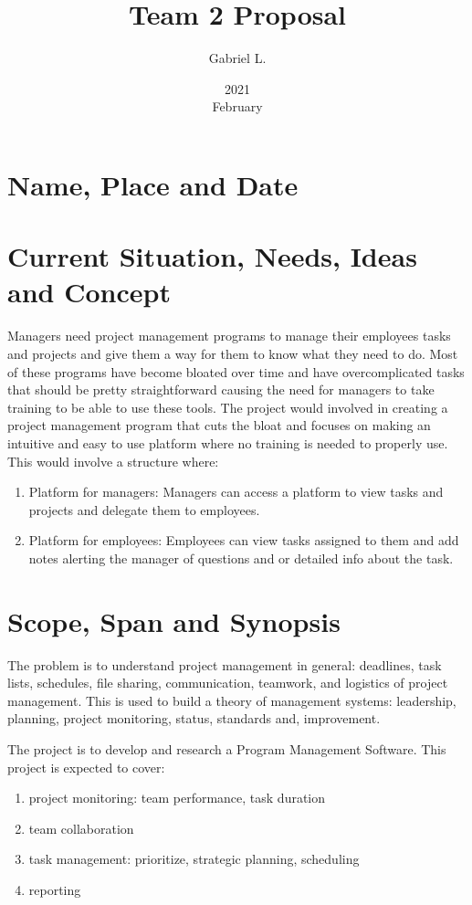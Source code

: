 \documentclass{article}
\title{Team 2 Proposal}
\date{2021 \\ February}
\author{Gabriel L.}
\begin{document}
\maketitle
\section{Name, Place and Date}

\section{Current Situation, Needs, Ideas and Concept}
Managers need project management programs to manage their employees tasks and projects and give them a way for them to know what they need to do. Most of these programs have become bloated over time and have overcomplicated tasks that should be pretty straightforward causing the need for managers to take training to be able to use these tools. The project would involved in creating a project management program that cuts the bloat and focuses on making an intuitive and easy to use platform where no training is needed to properly use. This would involve a structure where:
\begin{enumerate}
\item Platform for managers: Managers can access a platform to view tasks and projects and delegate them to employees.
\item Platform for employees: Employees can view tasks assigned to them and add notes alerting the manager of questions and or detailed info about the task.
\end{enumerate}
\section{Scope, Span and Synopsis}
The problem is to understand project management in general: deadlines, task lists, schedules, file sharing, communication, teamwork, and logistics of project management. This is used to build a theory of management systems: leadership, planning, project monitoring, status, standards and, improvement.

The project is to develop and research a Program Management Software. This project is expected to cover:
\begin{enumerate}
    \item project monitoring: team performance, task duration
    \item team collaboration
    \item task management: prioritize, strategic planning,  scheduling
    \item reporting
\end{enumerate}
\end{document}
